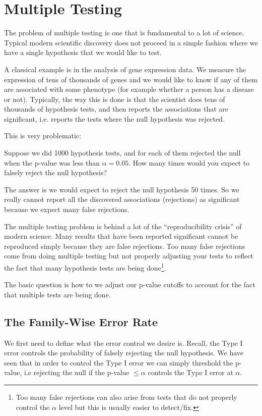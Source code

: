 \documentclass[twoside,12pt]{article}
\begin{document}
\section{Multiple Testing} 
The problem of multiple testing is one that is fundamental to a lot of science. 
Typical modern scientific discovery does not proceed in a simple fashion where we have a single hypothesis that we would like to test. 

A classical example is in the analysis of gene expression data. We measure the expression of tens of thousands of genes and we would like to know if any of them are associated with some phenotype (for example whether a person has a disease or not). Typically, the way this is done is that the scientist
does tens of thousands of hypothesis tests, and then reports the associations that are significant, i.e. reports the tests where the null hypothesis was rejected. 

This is very problematic: 

Suppose we did 1000 hypothesis tests, and for each of them rejected
the null when the p-value was less than $\alpha = 0.05$. How many times would you expect to falsely
reject the null hypothesis? 

The answer is we would expect to reject the null hypothesis 50 times. So we really cannot report all the discovered associations (rejections) as significant because we expect many false rejections.

The multiple testing problem is behind a lot of the ``reproducibility crisis'' of modern science. Many results that have been reported significant cannot be reproduced simply because they are false rejections. Too many false rejections come from doing multiple testing but not properly adjusting your tests to reflect the fact that many hypothesis tests are being done\footnote{Too many false rejections can also arise from tests that do not properly control the $\alpha$ level but this is usually easier to detect/fix.}.

The basic question is how to we adjust our p-value cutoffs to account for the fact that multiple tests are being done.

\subsection{The Family-Wise Error Rate}
We first need to define what the error control we desire is. Recall, the Type I error controls the probability of falsely rejecting the null hypothesis. We have seen that in order to control the Type I error
we can simply threshold the p-value, i.e rejecting the null if the p-value $\leq \alpha$ controls the Type I error at $\alpha$. 
\end{document}
